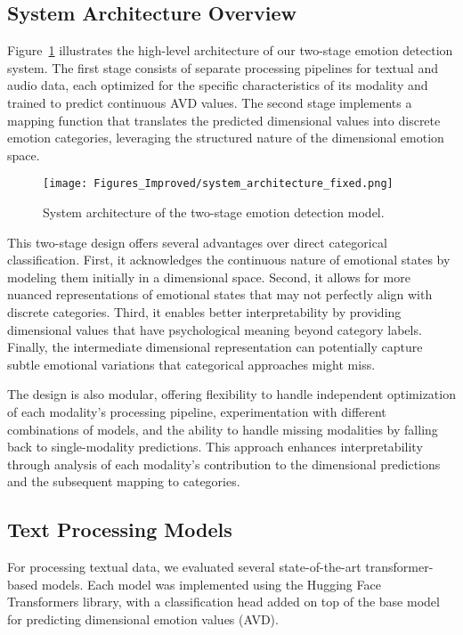 \documentclass[12pt]{article}
\begin{document}
\subsection{System Architecture Overview}
Figure~\ref{fig:system_architecture} illustrates the high-level architecture of our two-stage emotion detection system. The first stage consists of separate processing pipelines for textual and audio data, each optimized for the specific characteristics of its modality and trained to predict continuous AVD values. The second stage implements a mapping function that translates the predicted dimensional values into discrete emotion categories, leveraging the structured nature of the dimensional emotion space.

\begin{figure}[h]
    \centering
    \texttt{[image: Figures\_Improved/system\_architecture\_fixed.png]}
    \caption{System architecture of the two-stage emotion detection model.}
    \label{fig:system_architecture}
\end{figure}

This two-stage design offers several advantages over direct categorical classification. First, it acknowledges the continuous nature of emotional states by modeling them initially in a dimensional space. Second, it allows for more nuanced representations of emotional states that may not perfectly align with discrete categories. Third, it enables better interpretability by providing dimensional values that have psychological meaning beyond category labels. Finally, the intermediate dimensional representation can potentially capture subtle emotional variations that categorical approaches might miss.

The design is also modular, offering flexibility to handle independent optimization of each modality's processing pipeline, experimentation with different combinations of models, and the ability to handle missing modalities by falling back to single-modality predictions. This approach enhances interpretability through analysis of each modality's contribution to the dimensional predictions and the subsequent mapping to categories.

\subsection{Text Processing Models}
For processing textual data, we evaluated several state-of-the-art transformer-based models. Each model was implemented using the Hugging Face Transformers library, with a classification head added on top of the base model for predicting dimensional emotion values (AVD).
\end{document}
